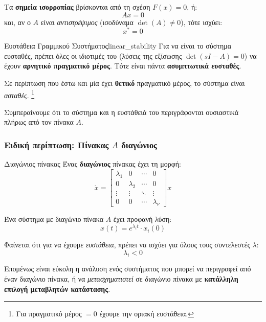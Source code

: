 \documentclass[11pt,a4paper,notitlepage,fleqn]{article}
\begin{document}
Τα \textbf{σημεία ισορροπίας} βρίσκονται από τη σχέση \( F(x) = 0 \), ή:
\[
Ax = 0
\]
και, αν ο \( A \) είναι \textit{αντιστρέψιμος} (ισοδύναμα \( \det(A)\neq 0 \)), τότε ισχύει:\[
x^* = 0
\]

\begin{theorem}{Ευστάθεια Γραμμικού Συστήματος}{linear_stability}
	Για να είναι το σύστημα ευσταθές,
	πρέπει όλες οι ιδιοτιμές του (λύσεις της εξίσωσης \( \det(sI-A)=0 \)) να έχουν
	\textbf{αρνητικό πραγματικό μέρος}. Τότε είναι πάντα \textbf{ασυμπτωτικά ευσταθές}.
	
	Σε περίπτωση που έστω και μία έχει \textbf{θετικό} πραγματικό
	μέρος, το σύστημα είναι \textit{ασταθές}. \footnote{Για πραγματικό μέρος
		\( =0 \) έχουμε την οριακή ευστάθεια.}
	
\end{theorem}

Συμπεραίνουμε ότι το σύστημα και η ευστάθειά του περιγράφονται ουσιαστικά πλήρως
από τον πίνακα \( A \).

\subsubsection{Ειδική περίπτωση: Πίνακας \( A \) διαγώνιος}
\begin{defn}{Διαγώνιος πίνακας}{}
	Ένας \textbf{διαγώνιος} πίνακας έχει τη μορφή:\[
	\dot x = \left[\begin{matrix}
	\lambda_1 & 0 & \cdots & 0 \\
	0 & \lambda_2 & \cdots & 0 \\
	\vdots & \vdots & \ddots & \vdots \\
	0 & 0 & \cdots & \lambda_\nu
	\end{matrix}
	\right] x
	\]
\end{defn}

Ένα σύστημα με διαγώνιο πίνακα \( A \) έχει προφανή λύση:
\[
x(t) = e^{\lambda_i t} \cdot x_i(0)
\]

Φαίνεται ότι για να έχουμε \textit{ευστάθεια}, πρέπει να ισχύει για όλους τους
συντελεστές \( \lambda \):
\[
\lambda_i < 0
\]

Επομένως είναι εύκολη η ανάλυση ενός συστήματος που μπορεί να περιγραφεί από
έναν διαγώνιο πίνακα, ή να \textit{μετασχηματιστεί} σε διαγώνιο πίνακα
με \textbf{κατάλληλη επιλογή μεταβλητών κατάστασης}.
\end{document}
